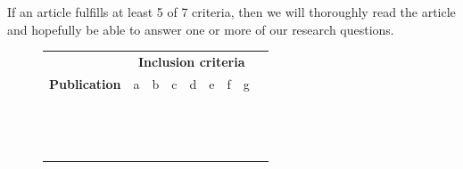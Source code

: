 \documentclass[a4paper,12pt]{article}
\newcommand{\xmark}{\color{red}\ding{53}}%
\newcommand{\cmark}{\color{green}\ding{51}}%
\begin{document}
\bigbreak
If an article fulfills at least 5 of 7 criteria, then we will thoroughly read the article and hopefully be able to answer one or more of our research questions.
\begin{figure}[H]
    \centering
    \begin{table}[H]
    \begin{tabularx}{\textwidth}{| @{} c | c | c | c | c | c | c | c | c |}
    \cline{1-8}
    & \multicolumn{7}{c|}{\textbf{Inclusion criteria}}\\
    \cline{1-8}
    \textbf{Publication} & a & b & c & d & e & f & g\\ 
    \cline{1-8}
    \cite{BD29}        & &  &  &  &  &  &\\        \cline{1-8}
    
    \cite{BD25}        &  &  &  &  &  &  & \\       \cline{1-8}
    \cite{BD38}     & \xmark & \cmark & \cmark  & \xmark  & \cmark  & \cmark  & \xmark \\     \cline{1-8}
    \cite{BD06}        & \xmark & \cmark  & \xmark  & \xmark & \cmark & \xmark  & \cmark  \\        \cline{1-8}
    \cite{BD40}        & \xmark  & \cmark  &  \xmark  & \xmark  & \xmark  & \xmark & \cmark \\        \cline{1-8}
    \cite{BD15}     & \xmark & \xmark & \xmark  & \xmark  & \xmark  & \xmark  & \xmark  \\        \cline{1-8}
    \cite{BD31}     &  \xmark & \xmark & \xmark  & \xmark  & \xmark & \xmark &  \cmark \\        \cline{1-8}
    \cite{BD14}        & \xmark & \cmark & \xmark  &  \cmark & \cmark & \xmark  & \cmark  \\        \cline{1-8}
    \cite{BD41}        &  \xmark & \cmark & \cmark  &  \xmark & \cmark & \cmark &  \cmark \\        \cline{1-8}
    \cite{BD09}        & \xmark & \cmark  & \cmark  & \xmark  & \cmark & \xmark  & \xmark  \\        \cline{1-8}
    \cite{BD18}        & \xmark & \cmark  & \cmark  & \xmark & \xmark  & \xmark & \cmark  \\        \cline{1-8}
    \cite{BD42}       & \xmark & \cmark  & \cmark & \xmark  & \xmark      & \xmark  & \cmark \\        \cline{1-8}
    \cite{BD19}         & \xmark & \xmark  & \xmark  & \cmark & \cmark  & \xmark  & \cmark  \\        \cline{1-8}
    \cite{BD48}         & \cmark & \cmark  &  \cmark & \cmark & \cmark & \xmark  & \cmark  \\        \cline{1-8}

\end{tabularx}
\end{table}
\end{figure}
\end{document}
